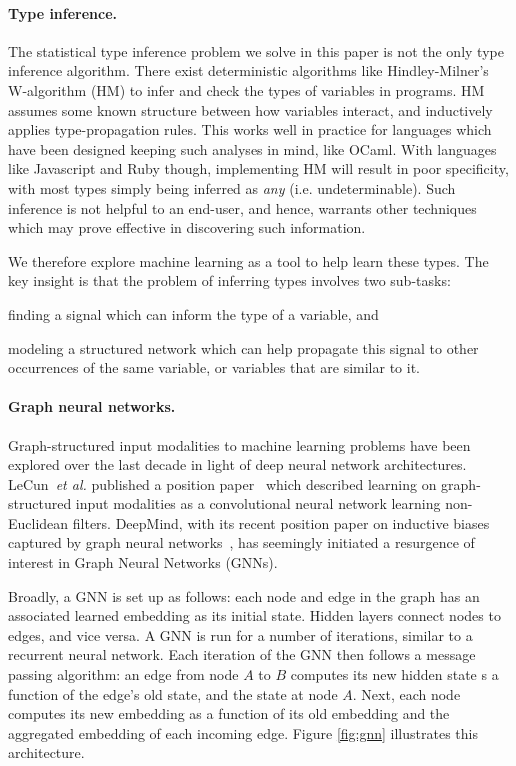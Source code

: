\paragraph{Type inference.}
The statistical type inference problem we solve in this paper is not the only type inference algorithm.
There exist deterministic algorithms like Hindley-Milner's W-algorithm (HM) to infer and check the types of variables in programs.
HM assumes some known structure between how variables interact, and inductively applies type-propagation rules.
This works well in practice for languages which have been designed keeping such analyses in mind, like OCaml.
With languages like Javascript and Ruby though, implementing HM will result in poor specificity, with most types simply being inferred as \textit{any} (i.e. undeterminable).
Such inference is not helpful to an end-user, and hence, warrants other techniques which may prove effective in discovering such information.

We therefore explore machine learning as a tool to help learn these types.
The key insight is that the problem of inferring types involves two sub-tasks:
\begin{enumerate*}[label=(\roman*)]
\item finding a signal which can inform the type of a variable, and
\item modeling a structured network which can help propagate this signal to other occurrences of the same variable, or variables that are similar to it.
\end{enumerate*}

\paragraph{Graph neural networks.}
Graph-structured input modalities to machine learning problems have been explored over the last decade in light of deep neural network architectures.
LeCun~\textit{et al.} published a position paper~\cite{henaff2015deep} which described learning on graph-structured input modalities as a convolutional neural network learning non-Euclidean filters.
DeepMind, with its recent position paper on inductive biases captured by graph neural networks~\cite{deepmind2018graph}, has seemingly initiated a resurgence of interest in Graph Neural Networks (GNNs).

Broadly, a GNN is set up as follows: each node and edge in the graph has an associated learned embedding as its initial state.
Hidden layers connect nodes to edges, and vice versa.
A GNN is run for a number of iterations, similar to a recurrent neural network.
Each iteration of the GNN then follows a message passing algorithm: an edge from node $A$ to $B$ computes its new hidden state s a function of the edge's old state, and the state at node $A$.
Next, each node computes its new embedding as a function of its old embedding and the aggregated embedding of each incoming edge.
Figure \ref{fig:gnn} illustrates this architecture.

